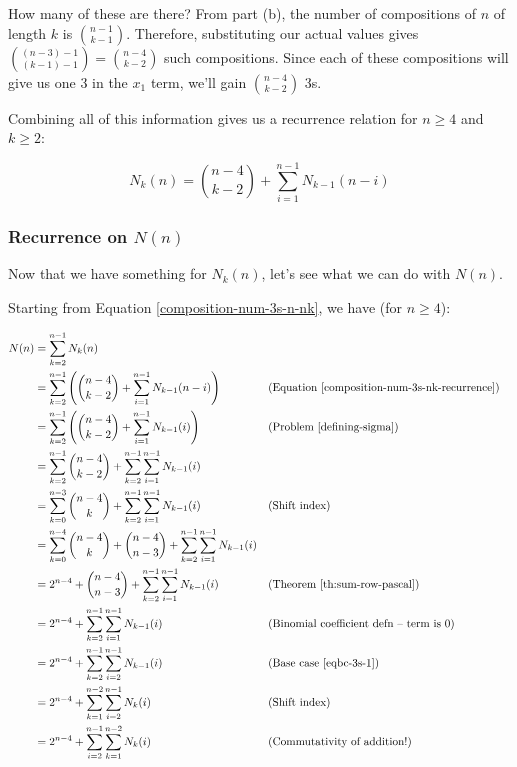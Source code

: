 How many of these are there? From part (b), the number of compositions of $n$ of length $k$ is $\binom{n-1}{k-1}$. Therefore, substituting our actual values gives $\binom{(n-3)-1}{(k-1)-1} = \binom{n-4}{k-2}$ such compositions. Since each of these compositions will give us one 3 in the $x_1$ term, we'll gain $\binom{n-4}{k-2}$ 3s.

Combining all of this information gives us a recurrence relation for $n \geq 4$ and $k \geq 2$:

\begin{equation} 
\label{composition-num-3s-nk-recurrence}
N_k(n) = \binom{n-4}{k-2} + \sum_{i=1}^{n-1} N_{k-1}(n-i)
\end{equation}


\subsubsection{Recurrence on $N(n)$}

Now that we have something for $N_k(n)$, let's see what we can do with $N(n)$. 

Starting from Equation \ref{composition-num-3s-n-nk}, we have (for $n \geq 4$):

\begin{align*}
N(n) &= \sum_{k=2}^{n-1} N_k(n) \\
&= \sum_{k=2}^{n-1} \left( \binom{n-4}{k-2} + \sum_{i=1}^{n-1} N_{k-1}(n-i) \right) && \text{(Equation \ref{composition-num-3s-nk-recurrence})} \\
&= \sum_{k=2}^{n-1} \left( \binom{n-4}{k-2} + \sum_{i=1}^{n-1} N_{k-1}(i) \right) && \text{(Problem \ref{defining-sigma})} \\
&= \sum_{k=2}^{n-1} \binom{n-4}{k-2} + \sum_{k=2}^{n-1} \sum_{i=1}^{n-1} N_{k-1}(i) \\
&= \sum_{k=0}^{n-3} \binom{n-4}{k} + \sum_{k=2}^{n-1} \sum_{i=1}^{n-1} N_{k-1}(i) && \text{(Shift index)} \\
&= \sum_{k=0}^{n-4} \binom{n-4}{k} + \binom{n-4}{n-3} + \sum_{k=2}^{n-1} \sum_{i=1}^{n-1} N_{k-1}(i) \\
&= 2^{n-4} + \binom{n-4}{n-3} + \sum_{k=2}^{n-1} \sum_{i=1}^{n-1} N_{k-1}(i) && \text{(Theorem \ref{th:sum-row-pascal})} \\
&= 2^{n-4} + \sum_{k=2}^{n-1} \sum_{i=1}^{n-1} N_{k-1}(i) && \text{(Binomial coefficient defn -- term is 0)} \\
&= 2^{n-4} + \sum_{k=2}^{n-1} \sum_{i=2}^{n-1} N_{k-1}(i) && \text{(Base case \ref{eqbc-3s-1})} \\
&= 2^{n-4} + \sum_{k=1}^{n-2} \sum_{i=2}^{n-1} N_{k}(i) && \text{(Shift index)} \\
&= 2^{n-4} + \sum_{i=2}^{n-1} \sum_{k=1}^{n-2} N_{k}(i) && \text{(Commutativity of addition!)} \\
\end{align*}

